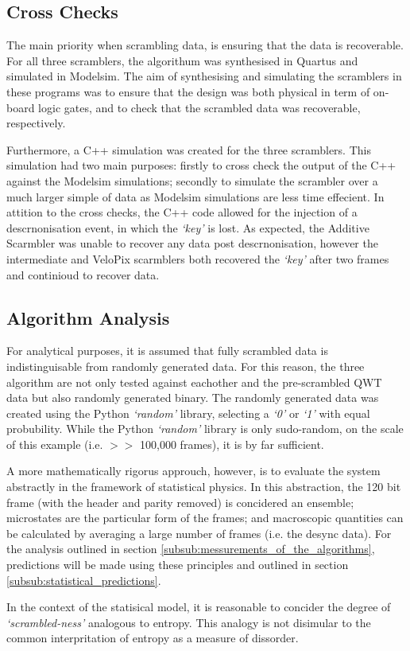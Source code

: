 	\subsection{Cross Checks} %
	\label{sub:cross_checks}
		The main priority when scrambling data, is ensuring that the data is recoverable.
		For all three scramblers, the algorithum was synthesised in Quartus\supercite{ref:quartus} and simulated in Modelsim\supercite{ref:modelsim}.
		The aim of synthesising and simulating the scramblers in these programs was to ensure that the design was both physical in term of on-board logic gates, and to check that the scrambled data was recoverable, respectively.
		\par
		Furthermore, a C++ simulation was created for the three scramblers.
		This simulation had two main purposes:
		firstly to cross check the output of the C++ against the Modelsim simulations;
		secondly to simulate the scrambler over a much larger simple of data as Modelsim simulations are less time effecient.
		In attition to the cross checks, the C++ code allowed for the injection of a descrnonisation event, in which the \textit{`key'} is lost.
		As expected, the Additive Scarmbler was unable to recover any data post descrnonisation, however the intermediate and VeloPix scarmblers both recovered the \textit{`key'} after two frames and continioud to recover data.


	\subsection{Algorithm Analysis}
	\label{sub:algorithm_analysis}

		For analytical purposes, it is assumed that fully scrambled data is indistinguisable from randomly generated data. 
		For this reason, the three algorithm are not only tested against eachother and the pre-scrambled QWT data but also randomly generated binary.
		The randomly generated data was created using the Python \textit{`random'} library, selecting a \textit{`0'} or \textit{`1'} with equal probubility.
		While the Python \textit{`random'} library is only sudo-random, on the scale of this example (i.e. $>>$ 100,000 frames), it is by far sufficient.
		\par
		A more mathematically rigorus approuch, however, is to evaluate the system abstractly in the framework of statistical physics.
		In this abstraction, the 120 bit frame (with the header and parity removed)  is concidered an ensemble; 
		microstates are the particular form of the frames;
		and macroscopic quantities can be calculated by averaging a large number of frames (i.e. the desync data).
		For the analysis outlined in section \ref{subsub:messurements_of_the_algorithms}, predictions will be made using these principles and outlined in section \ref{subsub:statistical_predictions}.
		\par
		In the context of the statisical model, it is reasonable to concider the degree of \textit{`scrambled-ness'} analogous to entropy.	This analogy is not disimular to the common interpritation of entropy as a measure of dissorder.


